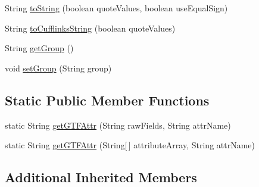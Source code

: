 \begin{DoxyCompactItemize}
\item 
String \hyperlink{classbroad_1_1core_1_1annotation_1_1_g_f_f_adbcf19a0f8333df39e5360afa326bc4c}{to\+String} (boolean quote\+Values, boolean use\+Equal\+Sign)
\item 
String \hyperlink{classbroad_1_1core_1_1annotation_1_1_g_f_f_a6a69adfec11fe148f3ab37dc93f3ea69}{to\+Cufflinks\+String} (boolean quote\+Values)
\item 
String \hyperlink{classbroad_1_1core_1_1annotation_1_1_g_f_f_acab364bbf9c317a31767e6b1adce7871}{get\+Group} ()
\item 
void \hyperlink{classbroad_1_1core_1_1annotation_1_1_g_f_f_aead35b291d127bc093c2ad2b9e5e8469}{set\+Group} (String group)
\end{DoxyCompactItemize}
\subsection*{Static Public Member Functions}
\begin{DoxyCompactItemize}
\item 
static String \hyperlink{classbroad_1_1core_1_1annotation_1_1_g_f_f_a775eff0dc1b7fba00a90abe52abeecd7}{get\+G\+T\+F\+Attr} (String raw\+Fields, String attr\+Name)
\item 
static String \hyperlink{classbroad_1_1core_1_1annotation_1_1_g_f_f_a4a9ee2ed894c9547fc85ac50012d779f}{get\+G\+T\+F\+Attr} (String\mbox{[}$\,$\mbox{]} attribute\+Array, String attr\+Name)
\end{DoxyCompactItemize}
\subsection*{Additional Inherited Members}


